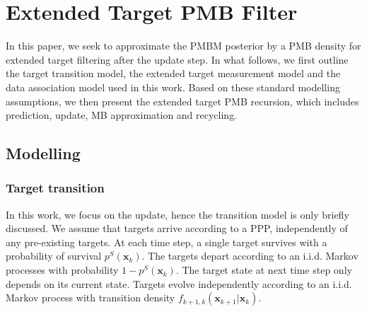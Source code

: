\documentclass[journal]{IEEEtran}
\begin{document}
\section{Extended Target PMB Filter}
\label{extendedPMB}
In this paper, we seek to approximate the PMBM posterior by a PMB density for extended target filtering after the update step. In what follows, we first outline the target transition model, the extended target measurement model and the data association model used in this work. Based on these standard modelling assumptions, we then present the extended target PMB recursion, which includes prediction, update, MB approximation and recycling.

\subsection{Modelling}
\label{section:models}

\subsubsection{Target transition}
In this work, we focus on the update, hence the transition model is only briefly discussed. We assume that targets arrive according to a PPP, independently of any pre-existing targets. At each time step, a single target survives with a probability of survival $p^S(\mathbf{x}_k)$. The targets depart according to an i.i.d. Markov processes with probability $1-p^S(\mathbf{x}_k)$. The target state at next time step only depends on its current state. Targets evolve independently according to an i.i.d. Markov process with transition density $f_{k+1,k}(\mathbf{x}_{k+1}|\mathbf{x}_{k})$. 
\end{document}
